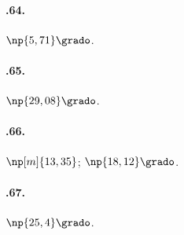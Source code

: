 \begin{multicols}{3}
\paragraph{\thechapter.64.}$\np{5,71}\grado$.

\paragraph{\thechapter.65.}$\np{29,08}\grado$.

\paragraph{\thechapter.66.}$\np[m]{13,35}$; $\np{18,12}\grado$.

\paragraph{\thechapter.67.}$\np{25,4}\grado$.
\end{multicols}
